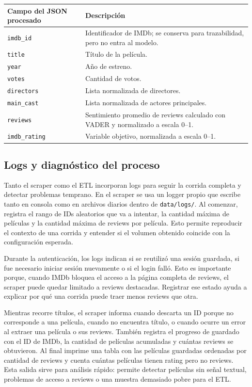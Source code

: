 \documentclass[letterpaper,12pt]{article}
\begin{document}
\begin{longtable}{p{5cm}p{11cm}}
\toprule
\textbf{Campo del JSON procesado} & \textbf{Descripción} \\
\midrule
\texttt{imdb\_id} & Identificador de IMDb; se conserva para trazabilidad, pero no entra al modelo. \\
\texttt{title} & Título de la película. \\
\texttt{year} & Año de estreno. \\
\texttt{votes} & Cantidad de votos. \\
\texttt{directors} & Lista normalizada de directores. \\
\texttt{main\_cast} & Lista normalizada de actores principales. \\
\texttt{reviews} & Sentimiento promedio de reviews calculado con VADER y normalizado a escala 0--1. \\
\texttt{imdb\_rating} & Variable objetivo, normalizada a escala 0--1. \\
\bottomrule
\end{longtable}

\subsection{Logs y diagnóstico del proceso}

Tanto el scraper como el ETL incorporan logs para seguir la corrida completa y detectar problemas temprano. En el scraper se usa un logger propio que escribe tanto en consola como en archivos diarios dentro de \texttt{data/logs/}. Al comenzar, registra el rango de IDs aleatorios que va a intentar, la cantidad máxima de películas y la cantidad máxima de reviews por película. Esto permite reproducir el contexto de una corrida y entender si el volumen obtenido coincide con la configuración esperada.

Durante la autenticación, los logs indican si se reutilizó una sesión guardada, si fue necesario iniciar sesión nuevamente o si el login falló. Esto es importante porque, cuando IMDb bloquea el acceso a la página completa de reviews, el scraper puede quedar limitado a reviews destacadas. Registrar ese estado ayuda a explicar por qué una corrida puede traer menos reviews que otra.

Mientras recorre títulos, el scraper informa cuando descarta un ID porque no corresponde a una película, cuando no encuentra título, o cuando ocurre un error al extraer una película o sus reviews. También registra el progreso de guardado con el ID de IMDb, la cantidad de películas acumuladas y cuántas reviews se obtuvieron. Al final imprime una tabla con las películas guardadas ordenadas por cantidad de reviews y cuenta cuántas películas tienen rating pero no reviews. Esta salida sirve para análisis rápido: permite detectar películas sin señal textual, problemas de acceso a reviews o una muestra demasiado pobre para el ETL.
\end{document}
